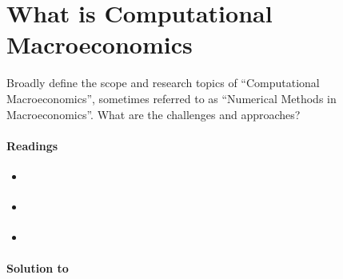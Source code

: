 \section[What is Computational Macroeconomics]{What is Computational Macroeconomics\label{ex:ComputationalMacroeconomics}}
Broadly define the scope and research topics of \enquote{Computational Macroeconomics}, 
	  sometimes referred to as \enquote{Numerical Methods in Macroeconomics}.
What are the challenges and approaches?

\paragraph{Readings}
\begin{itemize}
	\item \textcite[Ch. 1-2]{Fernandez-Villaverde.Rubio-Ramirez.Schorfheide_2016_SolutionEstimationMethods}
	\item \textcite[Ch. 1-2]{Maliar.Maliar_2014_NumericalMethodsLargeScale}
	\item \textcite[Ch. 1]{Judd_1998_NumericalMethodsEconomics}
\end{itemize}

\begin{solution}\textbf{Solution to }
\ifDisplaySolutions

\fi
\newpage
\end{solution}
